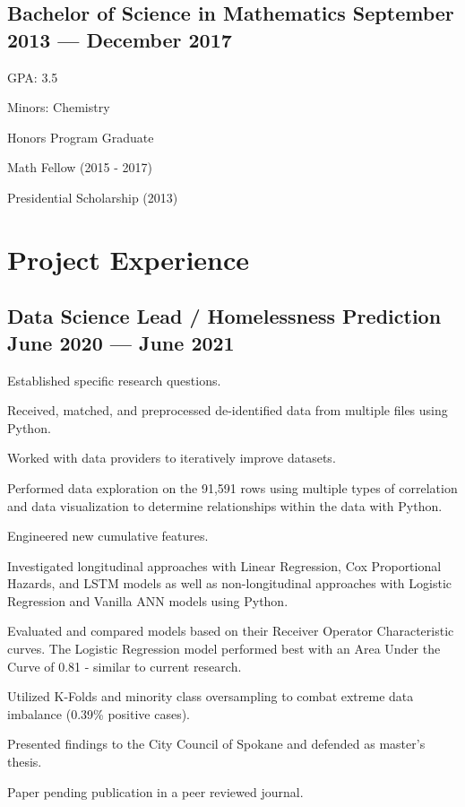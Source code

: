 \documentclass[letter,10pt]{article}
\begin{document}
\subsection{{Bachelor of Science in Mathematics \hfill September 2013 --- December 2017}}
\begin{zitemize}
    \item GPA: 3.5
    \item Minors: Chemistry
    \item Honors Program Graduate
    \item Math Fellow (2015 - 2017)
    \item Presidential Scholarship (2013)
\end{zitemize}

\section{Project Experience}
\subsection{{Data Science Lead / Homelessness Prediction \hfill June 2020 --- June 2021}}
\begin{zitemize}
    \item Established specific research questions.
    \item Received, matched, and preprocessed de-identified data from multiple files using Python.
    \item Worked with data providers to iteratively improve datasets.
    \item Performed data exploration on the 91,591 rows using multiple types of correlation and data visualization to determine relationships within the data with Python.
    \item Engineered new cumulative features.
    \item Investigated longitudinal approaches with Linear Regression, Cox Proportional Hazards, and LSTM models as well as non-longitudinal approaches with Logistic Regression and Vanilla ANN models using Python.
    \item Evaluated and compared models based on their Receiver Operator Characteristic curves. The Logistic Regression model performed best with an Area Under the Curve of 0.81 - similar to current research.
    \item Utilized K-Folds and minority class oversampling to combat extreme data imbalance (0.39\% positive cases).
    \item Presented findings to the City Council of Spokane and defended as master's thesis. 
    \item Paper pending publication in a peer reviewed journal.
\end{zitemize}
\end{document}
